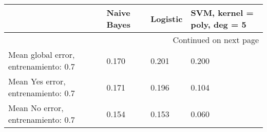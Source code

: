 \begin{longtable}{p{4cm}|p{1.5cm}|p{1.5cm}|p{1.5cm}}
\toprule
{} &  Naive Bayes &  Logistic &  SVM, kernel = poly, deg = 5 \\
\midrule
\endhead
\midrule
\multicolumn{4}{r}{{Continued on next page}} \\
\midrule
\endfoot

\bottomrule
\endlastfoot
Mean global error, entrenamiento: 0.7 &        0.170 &     0.201 &                        0.200 \\
Mean Yes error, entrenamiento: 0.7    &        0.171 &     0.196 &                        0.104 \\
Mean No error, entrenamiento: 0.7     &        0.154 &     0.153 &                        0.060 \\
\end{longtable}
